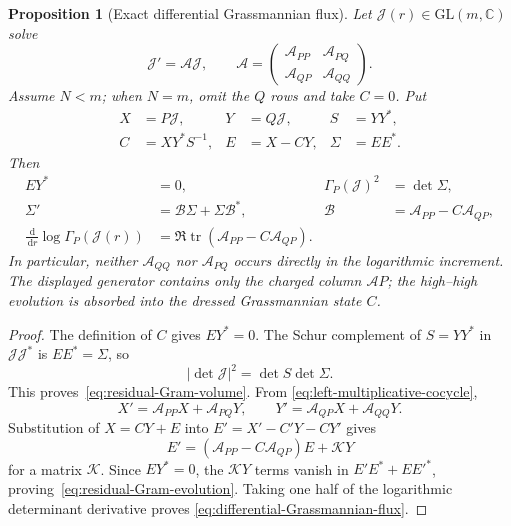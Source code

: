 \documentclass[11pt]{article}
\newcommand{\C}{\mathbb C}
\newcommand{\dd}{\,\mathrm d}
\DeclareMathOperator{\tr}{tr}
\newtheorem{proposition}[theorem]{Proposition}
\theoremstyle{definition}
\theoremstyle{remark}
\begin{document}
\begin{proposition}[Exact differential Grassmannian flux]\label{prop:differential-flux}
Let $\mathcal J(r)\in\mathrm{GL}(m,\C)$ solve
\begin{equation}
 \mathcal J'=\mathcal A\mathcal J,
 \qquad
 \mathcal A=
 \begin{pmatrix}
  \mathcal A_{PP}&\mathcal A_{PQ}\\
  \mathcal A_{QP}&\mathcal A_{QQ}
 \end{pmatrix}.
 \label{eq:left-multiplicative-cocycle}
\end{equation}
Assume $N<m$; when $N=m$, omit the $Q$ rows and take $C=0$.
Put
\begin{align}
 X&=P\mathcal J,&Y&=Q\mathcal J,&S&=YY^*,\label{eq:quotient-rows}\\
 C&=XY^*S^{-1},&E&=X-CY,&\Sigma&=EE^*.
 \label{eq:quotient-regression}
\end{align}
Then
\begin{align}
 EY^*&=0,
 &\Gamma_P(\mathcal J)^2&=\det\Sigma,
 \label{eq:residual-Gram-volume}\\
 \Sigma'
 &=\mathcal B\Sigma+\Sigma\mathcal B^*,
 &\mathcal B&=\mathcal A_{PP}-C\mathcal A_{QP},
 \label{eq:residual-Gram-evolution}\\
 \frac{\dd}{\dd r}\log\Gamma_P(\mathcal J(r))
 &=\Re\tr\!\left(\mathcal A_{PP}-C\mathcal A_{QP}\right).
 \label{eq:differential-Grassmannian-flux}
\end{align}
In particular, neither $\mathcal A_{QQ}$ nor $\mathcal A_{PQ}$ occurs
directly in the logarithmic increment.  The displayed generator contains only
the charged column $\mathcal AP$; the high--high evolution is absorbed into
the dressed Grassmannian state $C$.
\end{proposition}

\begin{proof}
The definition of $C$ gives $EY^*=0$.  The Schur complement of $S=YY^*$ in
$\mathcal J\mathcal J^*$ is $EE^*=\Sigma$, so
\begin{equation}
 |\det\mathcal J|^2=\det S\det\Sigma.
\end{equation}
This proves~\eqref{eq:residual-Gram-volume}.  From
\eqref{eq:left-multiplicative-cocycle},
\begin{equation}
 X'=\mathcal A_{PP}X+\mathcal A_{PQ}Y,
 \qquad
 Y'=\mathcal A_{QP}X+\mathcal A_{QQ}Y.
\end{equation}
Substitution of $X=CY+E$ into $E'=X'-C'Y-CY'$ gives
\begin{equation}
 E'=(\mathcal A_{PP}-C\mathcal A_{QP})E+\mathcal K Y
\end{equation}
for a matrix $\mathcal K$.  Since $EY^*=0$, the $\mathcal K Y$ terms vanish
in $E'E^*+EE'^*$, proving~\eqref{eq:residual-Gram-evolution}.  Taking one
half of the logarithmic determinant derivative proves
\eqref{eq:differential-Grassmannian-flux}.
\end{proof}
\end{document}

